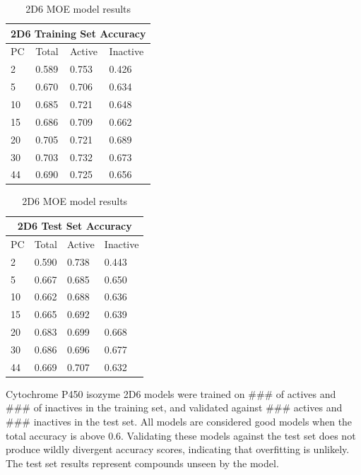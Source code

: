 \begin{table}[!h]
\begin{minipage}{.5\linewidth}
\centering
\begin{tabular}{|l|l|l|l|}
\hline
\multicolumn{4}{|c|}{2D6 Training Set Accuracy} \\ \hline
PC & Total          & Active          & Inactive\\ \hline
2  & 0.589          & 0.753           & 0.426   \\ \hline
5  & 0.670          & 0.706           & 0.634   \\ \hline
10 & 0.685          & 0.721           & 0.648   \\ \hline
15 & 0.686          & 0.709           & 0.662   \\ \hline
20 & 0.705          & 0.721           & 0.689   \\ \hline
30 & 0.703          & 0.732           & 0.673   \\ \hline
44 & 0.690          & 0.725           & 0.656   \\ \hline
\end{tabular}
\end{minipage}
\begin{minipage}{.5\linewidth}
\centering
\begin{tabular}{|l|l|l|l|}
\hline
\multicolumn{4}{|c|}{2D6 Test Set Accuracy}      \\ \hline
PC & Total          & Active          & Inactive \\ \hline
2  & 0.590          & 0.738           & 0.443    \\ \hline
5  & 0.667          & 0.685           & 0.650    \\ \hline
10 & 0.662          & 0.688           & 0.636    \\ \hline
15 & 0.665          & 0.692           & 0.639    \\ \hline
20 & 0.683          & 0.699           & 0.668    \\ \hline
30 & 0.686          & 0.696           & 0.677    \\ \hline
44 & 0.669          & 0.707           & 0.632    \\ \hline
\end{tabular}
\end{minipage}
\caption{2D6 MOE model results}
\end{table}

Cytochrome P450 isozyme 2D6 models were trained on ### of actives and ### of inactives in the training set, and validated against ### actives and ### inactives in the test set. All models are considered good models when the  total accuracy is above 0.6. Validating these models against the test set does not produce wildly divergent accuracy scores, indicating that overfitting is unlikely. The test set results represent compounds unseen by the model. 

